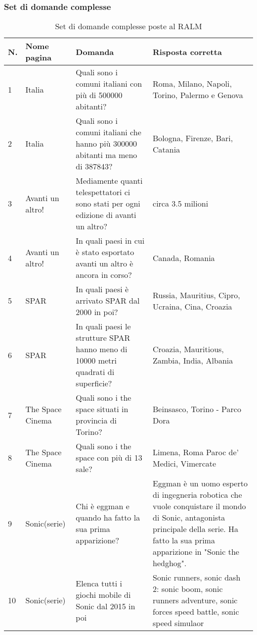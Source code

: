 \subsubsection{Set di domande complesse}
\begin{table}[H]
    \centering
    \begin{tabular}{|p{0.5cm} |p{2.5cm} |p{4cm}| p{4.5cm}|}
        \hline
        \textbf{N}. & \textbf{Nome pagina} & \textbf{Domanda} & \textbf{Risposta corretta} \\
        \hline
        1 & Italia & Quali sono i comuni italiani con più di 500000 abitanti? & Roma, Milano, Napoli, Torino, Palermo e Genova \\
        \hline
        2 & Italia & Quali sono i comuni italiani che hanno più 300000 abitanti ma meno di 387843? & Bologna, Firenze, Bari, Catania \\
        \hline
        3 & Avanti un altro! & Mediamente quanti telespettatori ci sono stati per ogni edizione di avanti un altro? & circa 3.5 milioni \\
        \hline
        4 & Avanti un altro! & In quali paesi in cui è stato esportato avanti un altro è ancora in corso? & Canada, Romania \\
        \hline
        5 & SPAR & In quali paesi è arrivato SPAR dal 2000 in poi? & Russia, Mauritius, Cipro, Ucraina, Cina, Croazia \\
        \hline
        6 & SPAR & In quali paesi le strutture SPAR hanno meno di 10000 metri quadrati di superficie? & Croazia, Mauritious, Zambia,  India, Albania \\
        \hline
        7 & The Space Cinema & Quali sono i the space situati in provincia di Torino? & Beinsasco, Torino - Parco Dora \\
        \hline
        8 & The Space Cinema & Quali sono i the space con più di 13 sale? & Limena, Roma Paroc de' Medici,  Vimercate \\
        \hline
        9 & Sonic(serie) & Chi è eggman e quando ha fatto la sua prima apparizione? & Eggman è un uomo esperto di ingegneria robotica che vuole conquistare il mondo di Sonic, antagonista principale della serie. Ha fatto la sua prima apparizione in "Sonic the hedghog". \\
        \hline
        10 & Sonic(serie) & Elenca tutti i giochi mobile di Sonic dal 2015 in poi & Sonic runners, sonic dash 2: sonic boom, sonic runners adventure, sonic forces speed battle, sonic speed simulaor \\
        \hline
    \end{tabular}
    \caption{Set di domande complesse poste al RALM}
\end{table}

